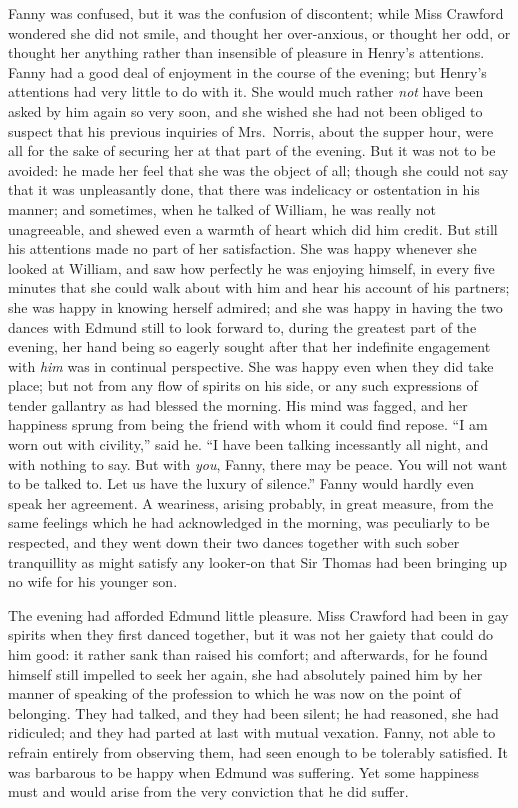 Fanny was confused, but it was the confusion of discontent;
while Miss Crawford wondered she did not smile, and thought
her over-anxious, or thought her odd, or thought her anything
rather than insensible of pleasure in Henry's attentions.
Fanny had a good deal of enjoyment in the course of the evening;
but Henry's attentions had very little to do with it.
She would much rather \emph{not} have been asked by him again
so very soon, and she wished she had not been obliged
to suspect that his previous inquiries of Mrs.\ Norris,
about the supper hour, were all for the sake of securing her
at that part of the evening.  But it was not to be avoided:
he made her feel that she was the object of all; though she
could not say that it was unpleasantly done, that there
was indelicacy or ostentation in his manner; and sometimes,
when he talked of William, he was really not unagreeable,
and shewed even a warmth of heart which did him credit.
But still his attentions made no part of her satisfaction.
She was happy whenever she looked at William, and saw how
perfectly he was enjoying himself, in every five minutes
that she could walk about with him and hear his account
of his partners; she was happy in knowing herself admired;
and she was happy in having the two dances with Edmund still
to look forward to, during the greatest part of the evening,
her hand being so eagerly sought after that her indefinite
engagement with \emph{him} was in continual perspective.
She was happy even when they did take place; but not from
any flow of spirits on his side, or any such expressions
of tender gallantry as had blessed the morning.
His mind was fagged, and her happiness sprung from
being the friend with whom it could find repose.
``I am worn out with civility,'' said he.  ``I have been
talking incessantly all night, and with nothing to say.
But with \emph{you}, Fanny, there may be peace.  You will not
want to be talked to.  Let us have the luxury of silence.''
Fanny would hardly even speak her agreement.  A weariness,
arising probably, in great measure, from the same feelings
which he had acknowledged in the morning, was peculiarly
to be respected, and they went down their two dances together
with such sober tranquillity as might satisfy any looker-on
that Sir Thomas had been bringing up no wife for his
younger son.

The evening had afforded Edmund little pleasure.  Miss Crawford
had been in gay spirits when they first danced together,
but it was not her gaiety that could do him good:
it rather sank than raised his comfort; and afterwards,
for he found himself still impelled to seek her again,
she had absolutely pained him by her manner of speaking of the
profession to which he was now on the point of belonging.
They had talked, and they had been silent; he had reasoned,
she had ridiculed; and they had parted at last with
mutual vexation.  Fanny, not able to refrain entirely from
observing them, had seen enough to be tolerably satisfied.
It was barbarous to be happy when Edmund was suffering.
Yet some happiness must and would arise from the very
conviction that he did suffer.

